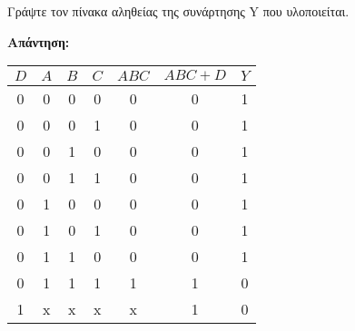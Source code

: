 \documentclass[draft]{article}
\begin{document}
\newpage
Γράψτε τον πίνακα αληθείας της συνάρτησης Y που υλοποιείται.

\textbf{Απάντηση: } \\
\begin{center}
  \begin{tabular}{ | c | c | c | c | c | c | c | }
    \hline $D$ & $A$ & $B$ & $C$ & $ABC$ & $ABC + D$ & $Y$ \\
    \hline 0 & 0 & 0 & 0 & 0 & 0 & 1 \\
           0 & 0 & 0 & 1 & 0 & 0 & 1 \\
           0 & 0 & 1 & 0 & 0 & 0 & 1 \\
           0 & 0 & 1 & 1 & 0 & 0 & 1 \\
           0 & 1 & 0 & 0 & 0 & 0 & 1 \\
           0 & 1 & 0 & 1 & 0 & 0 & 1 \\
           0 & 1 & 1 & 0 & 0 & 0 & 1 \\
           0 & 1 & 1 & 1 & 1 & 1 & 0 \\
           1 & x & x & x & x & 1 & 0 \\
      \hline
  \end{tabular}
\end{center}
\end{document}
